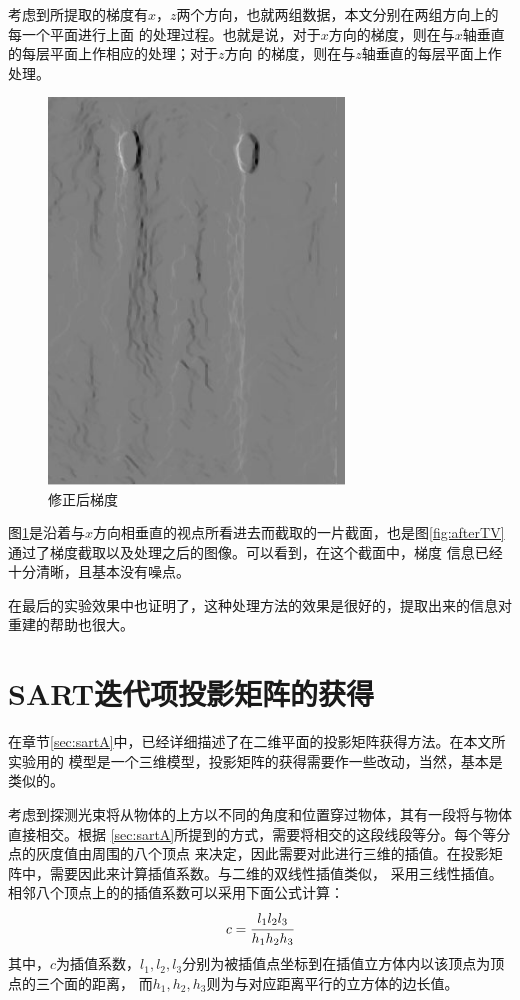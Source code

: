 考虑到所提取的梯度有$x$，$z$两个方向，也就两组数据，本文分别在两组方向上的每一个平面进行上面
的处理过程。也就是说，对于$x$方向的梯度，则在与$x$轴垂直的每层平面上作相应的处理；对于$z$方向
的梯度，则在与$z$轴垂直的每层平面上作处理。
\begin{figure}[!h]
\center
\includegraphics[width=0.7\textwidth]{figure/patternp/gradp.jpg}
\caption{修正后梯度}
\label{fig:gradp}
\end{figure}
图\ref{fig:gradp}是沿着与$x$方向相垂直的视点所看进去而截取的一片截面，也是图\ref{fig:afterTV}
通过了梯度截取以及处理之后的图像。可以看到，在这个截面中，梯度
信息已经十分清晰，且基本没有噪点。

在最后的实验效果中也证明了，这种处理方法的效果是很好的，提取出来的信息对重建的帮助也很大。


\section{SART迭代项投影矩阵的获得}\label{sec:obtainA}
在章节\ref{sec:sartA}中，已经详细描述了在二维平面的投影矩阵获得方法。在本文所实验用的
模型是一个三维模型，投影矩阵的获得需要作一些改动，当然，基本是类似的。

考虑到探测光束将从物体的上方以不同的角度和位置穿过物体，其有一段将与物体直接相交。根据
\ref{sec:sartA}所提到的方式，需要将相交的这段线段等分。每个等分点的灰度值由周围的八个顶点
来决定，因此需要对此进行三维的插值。在投影矩阵中，需要因此来计算插值系数。与二维的双线性插值类似，
采用三线性插值。相邻八个顶点上的的插值系数可以采用下面公式计算：
\begin{equation}
c = \cfrac{l_1l_2l_3}{h_1h_2h_3}
\end{equation}
其中，$c$为插值系数，$l_1,l_2,l_3$分别为被插值点坐标到在插值立方体内以该顶点为顶点的三个面的距离，
而$h_1,h_2,h_3$则为与对应距离平行的立方体的边长值。


